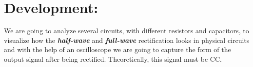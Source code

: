 \section{Development:}

We are going to analyze several circuits, with different resistors and capacitors, to visualize how the {\bfseries\itshape half-wave} and {\bfseries\itshape full-wave} rectification looks in physical circuits and with the help of an oscilloscope we are going to capture the form of the output signal after being rectified. Theoretically, this signal must be CC.
